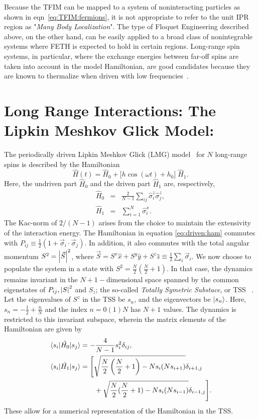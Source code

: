 \documentclass[%
reprint,
superscriptaddress,
amsmath,amssymb,
aps,
prb,
showkeys,
]{revtex4-2}
\begin{document}
	{Because the TFIM can be mapped to a system of noninteracting particles as shown in eqn}~\ref{eq:TFIM:fermions}, it is not appropriate to refer to the unit IPR region as "\emph{Many Body Localization}". The type of Floquet Engineering described above, on the other hand, can be easily applied to a broad class of nonintegrable systems where FETH is expected to hold in certain regions. Long-range spin systems, in particular, where the exchange energies between far-off spins are taken into account in the model Hamiltonian, are good candidates because they are known to thermalize when driven with low frequencies~\cite{russomanno_thermalization_2015}.
	\section{\label{sec:level3}Long Range Interactions: The Lipkin Meshkov Glick Model: }	
	The periodically driven {Lipkin Meshkov Glick (LMG)} model~\cite{lmg1965_1,defenu2018} for $N$ long-range spins is described by the Hamiltonian
	\begin{equation}
		\hat{H}(t) = \hat{H}_0 + \big[h \cos{(\omega t)} + h_0\big]\; \hat{H}_1.
		\label{eq:driven:ham}
	\end{equation}
	Here, the undriven part $\hat{H}_0$ and the driven part $\hat{H}_1$ are, respectively, 
	\begin{eqnarray}
		\hat{H}_0 &=& \frac{2}{N-1} \sum_{ij}\hat{\sigma}^z_i\hat{\sigma}^z_j,\nonumber \\
		\hat{H}_1 &=& \sum^N_{i=1}\hat{\sigma}^x_i.
		\label{eq:h0h1}
	\end{eqnarray}
	{The Kac-norm of $2/(N-1)$ arises from the choice to maintain the extensivity of the interaction energy}. The Hamiltonian in equation \ref{eq:driven:ham} commutes with $P_{ij} \equiv \displaystyle\frac{1}{2}\left(1+ \vec{\sigma}_i\cdot\vec{\sigma}_j\right)$. In addition, it also commutes with the total angular momentum $S^2 = \abs{\vec{S}}^2$, where $\vec{S}=S^x\hat{x}+S^y\hat{y}+S^z\hat{z}\equiv\frac12 \sum_i \vec{\sigma}_i$. We now choose to populate the system in a state with $S^2=\displaystyle\frac{N}{2}\left(\frac{N}{2}+1\right)$. In that case, the dynamics remains invariant in the  $N+1-$dimensional space spanned by the common eigenstates of $P_{ij}, \abs{S}^2$ and $S_z$; the so-called \textit{ Totally Symetric Substace}, or TSS ~\cite{mori_prethermalization_2019}. Let the eigenvalues of $S^z$ in the TSS be $s_n$, and the eigenvectors be $\ket{s_n}$. Here, $s_n=-\frac{1}{2}+\frac{n}{N}$ and the index
	$n= 0 (1) N$ has $N+1$ values. The dynamics is restricted to this invariant subspace, wherein the matrix elements of the Hamiltonian are given by
	\begin{align}
		\mel{s_i}{\hat{H_0}}{s_j} &= -\frac{4}{N-1} s^2_i \delta_{ij},\nonumber\\
		\mel{s_i}{\hat{H_1}}{s_j} &= \Bigg[\sqrt{\frac{N}{2}\left(\frac{N}{2}+1\right) - Ns_i(Ns_{i + 1})}\delta_{i+1, j} \nonumber\\ 
		&\hskip 0.7cm +\sqrt{\frac{N}{2}(\frac{N}{2}+1) - Ns_i(Ns_{i- 1})}\delta_{i-1,j}\Bigg].
		\label{eq:lmg:tssham}
	\end{align}
	These allow for a numerical representation of the Hamiltonian in the TSS.
	
\end{document}
